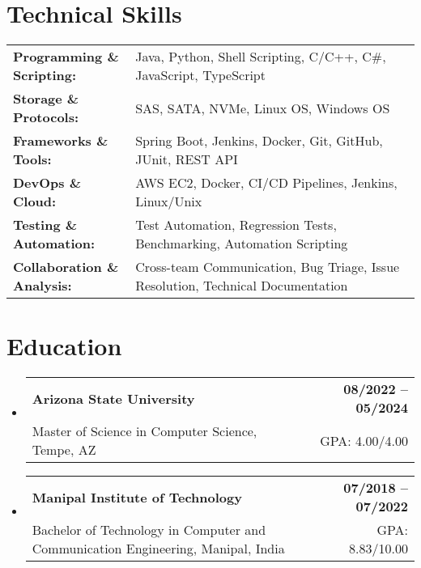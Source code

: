 \documentclass[letterpaper,11pt]{article}
\makeatletter
\newcommand{\educationSubheading}[4]{
  \vspace{-2pt}\item
    \begin{tabular*}{1.0\textwidth}[t]{l@{\extracolsep{\fill}}r}
      \textbf{\small #1} & \textbf{\small #2} \\
      {\small#3} & {\small #4} \\
    \end{tabular*}\vspace{-7pt}
}
\newcommand{\resumeSubHeadingListStart}{\begin{itemize}[leftmargin=0pt, label={}]}
\newcommand{\resumeSubHeadingListEnd}{\end{itemize}}
\makeatother
\begin{document}
\section{Technical Skills}
        \vspace{-14pt}
        \begin{table}[h]
            \footnotesize
            \begin{tabular}{p{0.3\linewidth} p{0.7\linewidth}}
                \textbf{Programming \& Scripting:} & Java, Python, Shell Scripting, C/C++, C\#, JavaScript, TypeScript \\
                \textbf{Storage \& Protocols:} & SAS, SATA, NVMe, Linux OS, Windows OS \\
                \textbf{Frameworks \& Tools:} & Spring Boot, Jenkins, Docker, Git, GitHub, JUnit, REST API \\
                \textbf{DevOps \& Cloud:} & AWS EC2, Docker, CI/CD Pipelines, Jenkins, Linux/Unix \\
                \textbf{Testing \& Automation:} & Test Automation, Regression Tests, Benchmarking, Automation Scripting \\
                \textbf{Collaboration \& Analysis:} & Cross-team Communication, Bug Triage, Issue Resolution, Technical Documentation \\
            \end{tabular}
        \end{table}

 \vspace{-15pt}

\section{Education}
  \resumeSubHeadingListStart
    \educationSubheading
      {Arizona State University}{08/2022 -- 05/2024}
      {Master of Science in Computer Science, Tempe, AZ}{GPA: 4.00/4.00}

    \educationSubheading
      {Manipal Institute of Technology}{07/2018 -- 07/2022}
      {Bachelor of Technology in Computer and Communication Engineering, Manipal, India}{GPA: 8.83/10.00}
  \resumeSubHeadingListEnd
\end{document}

